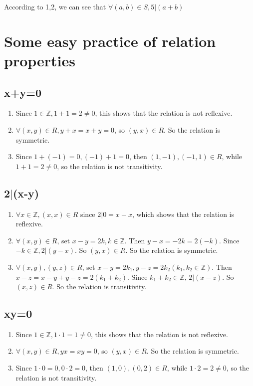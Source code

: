 \documentclass[a4paper,12pt,titlepage]{article}
\begin{document}
According to 1,2, we can see that $\forall (a,b)\in S, 5\big|(a+b)$

\section{Some easy practice of relation properties}
\subsection{x+y=0}
\begin{enumerate}
\item Since $1\in\mathbb{Z},1+1=2\neq0$, this shows that the relation is not reflexive.
\item $\forall (x,y)\in R, y+x=x+y=0$, so $(y,x)\in R$. So the relation is symmetric.
\item Since $1+(-1)=0,(-1)+1=0$, then $(1,-1),(-1,1)\in R$, while $1+1=2\neq0$,  so the relation is not transitivity.
\end{enumerate}

\subsection{2$\big|$(x-y)}
\begin{enumerate}
\item $\forall x\in\mathbb{Z}, (x,x)\in R$ since $2\big|0=x-x$, which shows that the relation is reflexive.
\item $\forall (x,y)\in R$, set $x-y=2k,k\in\mathbb{Z}$. Then $y-x=-2k=2(-k)$. Since $-k\in\mathbb{Z}, 2\big|(y-x)$. So $(y,x)\in R$. So the relation is symmetric.
\item $\forall (x,y),(y,z)\in R$, set $ x-y=2k_1, y-z=2k_2(k_1,k_2\in\mathbb{Z})$. Then $x-z=x-y+y-z=2(k_1+k_2)$. Since $k_1+k_2\in\mathbb{Z}$, $2\big|(x-z)$. So $(x,z)\in R$. So the relation is transitivity.
\end{enumerate}


\subsection{xy=0}
\begin{enumerate}
\item Since $1\in\mathbb{Z},1\cdot1=1\neq0$, this shows that the relation is not reflexive.
\item $\forall (x,y)\in R, yx=xy=0$, so $(y,x)\in R$. So the relation is symmetric.
\item Since $1\cdot 0=0,0\cdot 2=0$, then $(1,0),(0,2)\in R$, while $1\cdot2=2\neq0$,  so the relation is not transitivity.
\end{enumerate}
\end{document}
